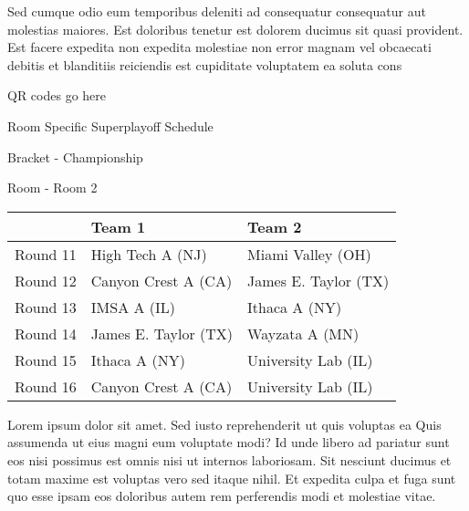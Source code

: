 \documentclass{article}%
\begin{document}
\newline%
    Sed cumque odio eum temporibus deleniti ad consequatur consequatur aut molestias maiores. Est doloribus tenetur est dolorem ducimus sit quasi provident. Est facere expedita non expedita molestiae non error magnam vel obcaecati debitis et blanditiis reiciendis est cupiditate voluptatem ea soluta cons%
\vspace*{140pt}%
\begin{center}%
\begin{Huge}%
QR codes go here%
\end{Huge}%
\end{center}%
\newpage%
\begin{center}%
\begin{Huge}%
Room Specific Superplayoff Schedule%
\end{Huge}%
\vspace*{8pt}%
\linebreak%
\begin{Large}%
Bracket {-} Championship%
\end{Large}%
\vspace*{8pt}%
\linebreak%
\vspace*{8pt}%
\begin{Large}%
Room {-} Room 2%
\end{Large}%
\end{center}%
%
\begin{tabularx}{\textwidth}{|c|Y|Y|}%
\hline%
&Team 1&Team 2\\%
\hline%
Round 11&High Tech A (NJ)&Miami Valley (OH)\\%
Round 12&Canyon Crest A (CA)&James E. Taylor (TX)\\%
Round 13&IMSA A (IL)&Ithaca A (NY)\\%
Round 14&James E. Taylor (TX)&Wayzata A (MN)\\%
Round 15&Ithaca A (NY)&University Lab (IL)\\%
Round 16&Canyon Crest A (CA)&University Lab (IL)\\%
\hline%
\end{tabularx}%
\vspace*{8pt}%
\newline%
    Lorem ipsum dolor sit amet. Sed iusto reprehenderit ut quis voluptas ea Quis assumenda ut eius magni eum voluptate modi? Id unde libero ad pariatur sunt eos nisi possimus est omnis nisi ut internos laboriosam. Sit nesciunt ducimus et totam maxime est voluptas vero sed itaque nihil. Et expedita culpa et fuga sunt quo esse ipsam eos doloribus autem rem perferendis modi et molestiae vitae.\newline%
\end{document}
